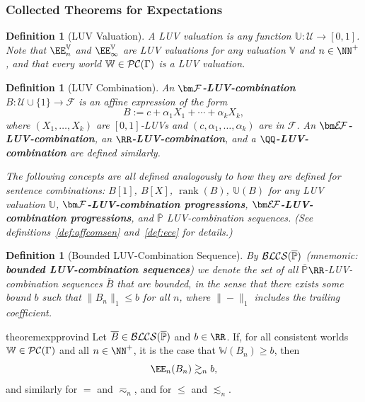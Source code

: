 \documentclass[authordate,onecolumn,noenvironments]{miri-tech-article}
\newtheorem{definition}[theorem]{Definition}
\numberwithin{equation}{subsection}
\newcommand{\seq}[1]{{\overline{#1}}}
\newcommand{\any}{-}
\newcommand{\affconst}{c}
\newcommand{\fconst}{1}
\newcommand{\rank}{\operatorname{rank}}
\newcommand{\LUVs}{\mathcal{U}}%
\newcommand{\nn}{n}
\newcommand{\pgenable}{\ensuremath{\MP}\text{-generable}\xspace}
\newcommand{\rparenthetical}[1]{\hfill\upshape{{\small (#1)}}} %
\newcommand{\proofin}[1]{\rparenthetical{Proof in:~#1.}}
\newcommand{\features}{\mathcal{F}} %
\newcommand{\exfeatures}{\mathcal{E\!F}} %
\newcommand{\affluv}{B} %
\newcommand{\BLCS}[1][\MP]{\mathcal{B\-L\-C\-S}(#1)} %
\newcommand{\luvval}{\mathbb{U}}
\newcommand{\BelState}{\mathbb{P}}
\newcommand{\Valuation}{\mathbb{V}}
\newcommand{\pt}{\BelState}
\newcommand{\MP}{\seq{\pt}}
\newcommand{\cworlds}{\mathcal{P\-C}} %
\newcommand{\World}{\mathbb{W}}
\newcommand{\Theory}{\Gamma}
\begin{document}
\subsubsection{Collected Theorems for Expectations}

\begin{definition}[LUV Valuation]
  A LUV valuation is any function $\luvval: \LUVs\to[0, 1]$.  Note that 
  $\EE_n^\Valuation$ and $\EE_\infty^\Valuation$ are LUV valuations for any valuation $\Valuation$ and $\nn \in \NN^+$, and that every world $\World \in \cworlds(\Theory)$ is a LUV valuation.
\end{definition}

\begin{definition}[LUV Combination]
  An \textbf{$\bm\features$-LUV-combination} $\affluv : \LUVs \cup \{1\} \to \features$ is an affine expression of the form
  \[
    \affluv := \affconst + \alpha_1 X_1 + \cdots + \alpha_k X_k,
  \]
  where $(X_1,\ldots,X_k)$ are $[0, 1]$-LUVs and $(\affconst, \alpha_1, \ldots, \alpha_k)$ are in $\features$.  An \textbf{$\bm\exfeatures$-LUV-combination}, an \textbf{$\RR$-LUV-combination}, and a \textbf{$\QQ$-LUV-combination} are defined similarly.
  
  The following concepts are all defined analogously to how they are defined for sentence combinations: $\affluv[\fconst]$, $\affluv[X]$, $\rank(\affluv)$, $\luvval(\affluv)$ for any LUV valuation $\luvval$,
  \textbf{$\bm\features$-LUV-combination progressions}, \textbf{$\bm\exfeatures$-LUV-combination progressions}, and \pgenable LUV-combination sequences. (See definitions~\ref{def:affcomsen} and~\ref{def:ece} for details.)
\end{definition}

\begin{definition}[Bounded LUV-Combination Sequence]\label{def:blcp}
  By $\BLCS$ (mnemonic: \textbf{bounded LUV-combination sequences}) we denote the set of all \pgenable $\RR$-LUV-combination sequences $\seq{\affluv}$ that are bounded, in the sense that there exists some bound $b$ such that $\| \affluv_\nn \|_1 \le b$ for all $\nn$, where $\|\!\any\!\|_1$ includes the trailing coefficient.
\end{definition}

\begin{restatable}{theorem}{expprovind}\label{thm:expprovind}
  Let $\seq{\affluv}\in\BLCS$ and $b \in \RR$. If, for all consistent worlds $\World\in\cworlds(\Theory)$ and all $\nn \in \NN^+$, it is the case that $\World(\affluv_n ) \ge b$, then
  \[
    \EE_\nn(\affluv_\nn ) \gtrsim_\nn b,
  \]
  and similarly for $=$ and $\eqsim_\nn$, and for $\leq$ and $\lesssim_\nn$.
  \proofin{\ref{app:expprovind}}
\end{restatable}
\end{document}
